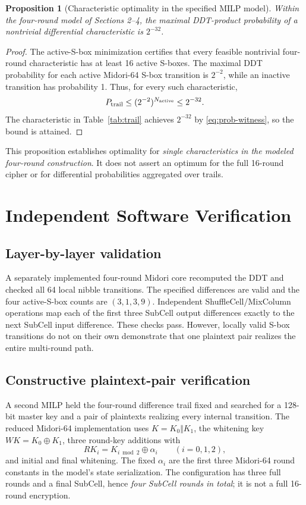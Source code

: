 \documentclass[11pt,a4paper]{article}
\newtheorem{proposition}{Proposition}
\begin{document}
\begin{proposition}[Characteristic optimality in the specified MILP model]\label{prop:opt}
Within the four-round model of Sections 2--4, the maximal DDT-product
probability of a nontrivial differential characteristic is $2^{-32}$.
\end{proposition}
\begin{proof}
The active-S-box minimization certifies that every feasible nontrivial four-round characteristic has
at least 16 active S-boxes. The maximal DDT probability for each active
Midori-64 S-box transition is $2^{-2}$, while an inactive transition has
probability 1. Thus, for every such characteristic,
\[
 P_{\rm trail}\leq(2^{-2})^{N_{\rm active}}\leq2^{-32}.
\]
The characteristic in Table~\ref{tab:trail} achieves $2^{-32}$ by
\eqref{eq:prob-witness}, so the bound is attained.
\end{proof}
This proposition establishes optimality for \emph{single characteristics in
the modeled four-round construction}. It does not assert an optimum for the
full 16-round cipher or for differential probabilities aggregated over trails.

\section{Independent Software Verification}
\subsection{Layer-by-layer validation}
A separately implemented four-round Midori core recomputed the DDT and
checked all 64 local nibble transitions. The specified differences are
valid and the four active-S-box counts are $(3,1,3,9)$. Independent
ShuffleCell/MixColumn operations map each of the first three SubCell output
differences exactly to the next SubCell input difference. These checks pass.
However, locally valid S-box transitions do not on their own demonstrate that
one plaintext pair realizes the entire multi-round path.

\subsection{Constructive plaintext-pair verification}
A second MILP held the four-round difference trail fixed and searched for a
128-bit master key and a pair of plaintexts realizing every internal transition.
The reduced Midori-64 implementation uses $K=K_0\Vert K_1$, the whitening key
$WK=K_0\oplus K_1$, three round-key additions with
\begin{equation}\label{eq:key}
 RK_i=K_{i\bmod 2}\oplus\alpha_i\qquad(i=0,1,2),
\end{equation}
and initial and final whitening. The fixed $\alpha_i$ are the first three
Midori-64 round constants in the model's state serialization. The configuration
has three full rounds and a final SubCell, hence \emph{four SubCell rounds in
total}; it is not a full 16-round encryption.
\end{document}
